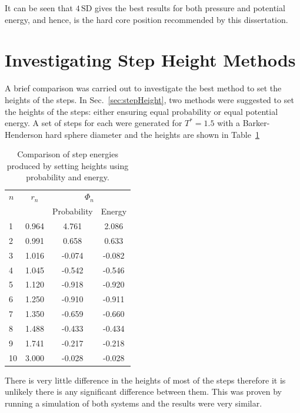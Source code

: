 \documentclass[12pt]{UoAthesis} \usepackage{booktabs}
\begin{document}
It can be seen that $4\,\text{SD}$ gives the best results for both pressure
and potential energy, and hence, is the hard core position recommended
by this dissertation.
\section{Investigating Step Height Methods}

A brief comparison was carried out to investigate the best method to
set the heights of the steps.  In Sec.~\ref{sec:stepHeight}, two
methods were suggested to set the heights of the steps: either
ensuring equal probability or equal potential energy.  A set of
steps for each were generated for $T^*=1.5$ with a Barker-Henderson
hard sphere diameter and the heights are shown in Table~\ref{tab:heightcomp}

\begin{table} [htp]
  \caption[Comparison of step energies created by different methods]
  {Comparison of step energies produced by setting heights using probability and energy.}
  \label{tab:heightcomp}
  \begin{center}
    \begin{tabular} {l c c c}
      \toprule
      $n$ & $r_n$ & \multicolumn{2}{c}{$\Phi_n$} \\
      \cmidrule(rl{0.75em}){3-4}
      & & Probability & Energy \\
      \midrule
      1 & 0.964 &  4.761 & 2.086 \\
      2 & 0.991 &  0.658 & 0.633\\
      3 & 1.016 & -0.074 & -0.082 \\
      4 & 1.045 & -0.542 & -0.546 \\
      5 & 1.120 & -0.918 & -0.920 \\
      6 & 1.250 & -0.910 & -0.911 \\
      7 & 1.350 & -0.659 & -0.660 \\
      8 & 1.488 & -0.433 & -0.434 \\
      9 & 1.741 & -0.217 & -0.218 \\
      10& 3.000 & -0.028 & -0.028 \\
      \bottomrule
    \end{tabular}
  \end{center}
\end{table}

There is very little difference in the heights of most of the steps
therefore it is unlikely there is any significant difference between
them.  This was proven by running a simulation of both systems and the
results were very similar.
\end{document}

